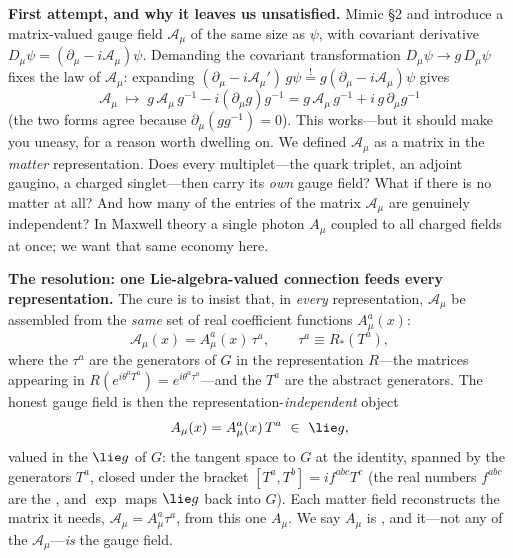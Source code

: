 \documentclass[11pt]{article}
\begin{document}
\medskip
\noindent\textbf{First attempt, and why it leaves us unsatisfied.} Mimic \S2 and
introduce a matrix-valued gauge field $\mathcal A_\mu$ of the same size as $\psi$, with
covariant derivative $D_\mu\psi=(\partial_\mu-i\mathcal A_\mu)\psi$. Demanding the
covariant transformation $D_\mu\psi\to g\,D_\mu\psi$ fixes the law of $\mathcal A_\mu$:
expanding $(\partial_\mu-i\mathcal A_\mu')\,g\psi \stackrel{!}{=} g(\partial_\mu-i\mathcal
A_\mu)\psi$ gives
\[
\mathcal A_\mu\;\longmapsto\;g\,\mathcal A_\mu\,g^{-1}-i(\partial_\mu g)g^{-1}
=g\,\mathcal A_\mu\,g^{-1}+i\,g\,\partial_\mu g^{-1}
\]
(the two forms agree because $\partial_\mu(gg^{-1})=0$). This works---but it should make
you uneasy, for a reason worth dwelling on. We defined $\mathcal A_\mu$ as a matrix in the
\emph{matter} representation. Does every multiplet---the quark triplet, an adjoint
gaugino, a charged singlet---then carry its \emph{own} gauge field? What if there is no
matter at all? And how many of the entries of the matrix $\mathcal A_\mu$ are genuinely
independent? In Maxwell theory a single photon $A_\mu$ coupled to all charged fields at
once; we want that same economy here.

\medskip
\noindent\textbf{The resolution: one Lie-algebra-valued connection feeds every
representation.} The cure is to insist that, in \emph{every} representation, $\mathcal
A_\mu$ be assembled from the \emph{same} set of real coefficient functions $A_\mu^a(x)$:
\[
\mathcal A_\mu(x)=A_\mu^a(x)\,\tau^a,\qquad \tau^a\equiv R_*(T^a),
\]
where the $\tau^a$ are the generators of $G$ in the representation $R$---the matrices
appearing in $R(e^{i\theta^a T^a})=e^{i\theta^a\tau^a}$---and the $T^a$ are the abstract
generators. The honest gauge field is then the representation-\emph{independent} object
\[
A_\mu(x)=A_\mu^a(x)\,T^a\ \in\ \lie g,
\]
valued in the  $\lie g$ of $G$: the tangent space to $G$ at the
identity, spanned by the generators $T^a$, closed under the bracket
$[T^a,T^b]=if^{abc}T^c$ (the real numbers $f^{abc}$ are the ,
and $\exp$ maps $\lie g$ back into $G$). Each matter field reconstructs the matrix it
needs, $\mathcal A_\mu=A_\mu^a\tau^a$, from this one $A_\mu$. We say $A_\mu$ is
, and it---not any of the $\mathcal A_\mu$---\emph{is} the gauge
field.
\end{document}
